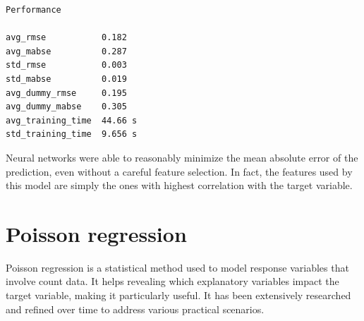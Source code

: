 \documentclass[
]{article}
\begin{document}
\begin{verbatim}
Performance

avg_rmse           0.182
avg_mabse          0.287
std_rmse           0.003
std_mabse          0.019
avg_dummy_rmse     0.195
avg_dummy_mabse    0.305
avg_training_time  44.66 s
std_training_time  9.656 s
\end{verbatim}

Neural networks were able to reasonably minimize the mean absolute error
of the prediction, even without a careful feature selection. In fact,
the features used by this model are simply the ones with highest
correlation with the target variable.

\section{Poisson regression}\label{poisson-regression}

Poisson regression is a statistical method used to model response
variables that involve count data. It helps revealing which explanatory
variables impact the target variable, making it particularly useful. It
has been extensively researched and refined over time to address various
practical scenarios.
\end{document}
